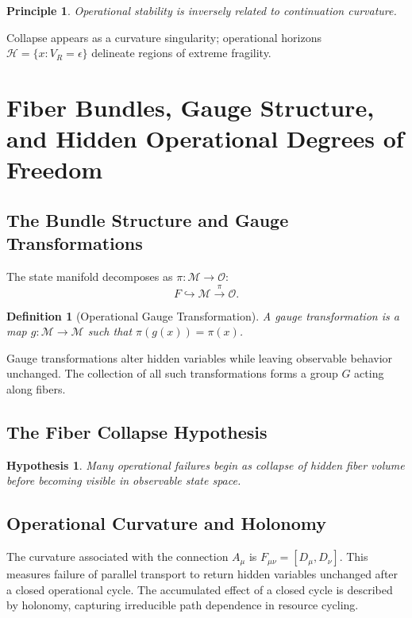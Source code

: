 \documentclass[12pt,a4paper]{article}
\newtheorem{definition}[theorem]{Definition}
\newtheorem*{principle}{Principle}
\newtheorem*{hypothesis}{Hypothesis}
\newcommand{\M}{\mathcal{M}}
\begin{document}
\begin{principle}
Operational stability is inversely related to continuation curvature.
\end{principle}

Collapse appears as a curvature singularity; operational horizons $\mathcal{H} = \{ x : V_R = \epsilon \}$ delineate regions of extreme fragility.

\section{Fiber Bundles, Gauge Structure, and Hidden Operational Degrees of Freedom}

\subsection{The Bundle Structure and Gauge Transformations}

The state manifold decomposes as $\pi : \M \to \mathcal{O}$:
\[
F \hookrightarrow \M \overset{\pi}{\longrightarrow} \mathcal{O}.
\]

\begin{definition}[Operational Gauge Transformation]
A \emph{gauge transformation} is a map $g : \M \to \M$ such that $\pi(g(x)) = \pi(x)$.
\end{definition}

Gauge transformations alter hidden variables while leaving observable behavior unchanged. The collection of all such transformations forms a group $G$ acting along fibers.

\subsection{The Fiber Collapse Hypothesis}

\begin{hypothesis}
Many operational failures begin as collapse of hidden fiber volume before becoming visible in observable state space.
\end{hypothesis}

\subsection{Operational Curvature and Holonomy}

The curvature associated with the connection $A_\mu$ is $F_{\mu\nu} = [D_\mu, D_\nu]$. This measures failure of parallel transport to return hidden variables unchanged after a closed operational cycle. The accumulated effect of a closed cycle is described by holonomy, capturing irreducible path dependence in resource cycling.
\end{document}

